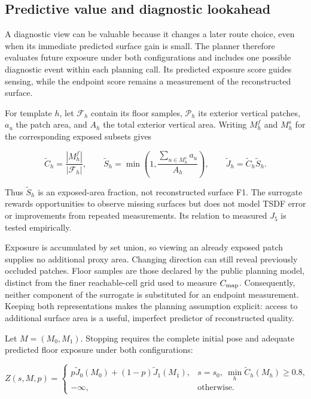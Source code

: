 \documentclass[11pt,a4paper]{article}
\providecommand{\hypertarget}[2]{#2}
\begin{document}
\hypertarget{predictive-value-and-diagnostic-lookahead}{%
\subsection{Predictive value and diagnostic lookahead}\label{predictive-value-and-diagnostic-lookahead}}

A diagnostic view can be valuable because it changes a later route choice, even when its immediate predicted surface gain is small. The planner therefore evaluates future exposure under both configurations and includes one possible diagnostic event within each planning call. Its predicted exposure score guides sensing, while the endpoint score remains a measurement of the reconstructed surface.

For template \(h\), let \(\mathcal F_h\) contain its floor samples, \(\mathcal P_h\) its exterior vertical patches, \(a_u\) the patch area, and \(A_h\) the total exterior vertical area. Writing \(M_h^f\) and \(M_h^s\) for the corresponding exposed subsets gives

\[
\widetilde C_h=\frac{|M_h^f|}{|\mathcal F_h|},\qquad
\widetilde S_h=\min\left(1,\frac{\sum_{u\in M_h^s}a_u}{A_h}\right),\qquad
\widetilde J_h=\widetilde C_h\widetilde S_h.
\]

Thus \(\widetilde S_h\) is an exposed-area fraction, not reconstructed surface F1. The surrogate rewards opportunities to observe missing surfaces but does not model TSDF error or improvements from repeated measurements. Its relation to measured \(J_5\) is tested empirically.

Exposure is accumulated by set union, so viewing an already exposed patch supplies no additional proxy area. Changing direction can still reveal previously occluded patches. Floor samples are those declared by the public planning model, distinct from the finer reachable-cell grid used to measure \(C_{\rm map}\). Consequently, neither component of the surrogate is substituted for an endpoint measurement. Keeping both representations makes the planning assumption explicit: access to additional surface area is a useful, imperfect predictor of reconstructed quality.

Let \(M=(M_0,M_1)\). Stopping requires the complete initial pose and adequate predicted floor exposure under both configurations:

\[
Z(s,M,p)=
\begin{cases}
p\widetilde J_0(M_0)+(1-p)\widetilde J_1(M_1),
&s=s_0,\ \min_h\widetilde C_h(M_h)\ge0.8,\\
-\infty,&\text{otherwise}.
\end{cases}
\]
\end{document}

